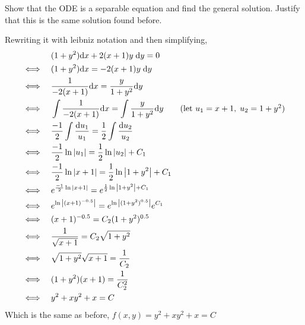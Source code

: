 Show that the ODE is a separable equation and find the general solution. Justify that this is the same solution found before.

\nnl Rewriting it with leibniz notation and then simplifying,
\begin{align*}
     & \quad (1+y^2)\dd x + 2(x+1)y\; \dd y = 0\\
    \iff & \quad (1+y^2)\dd x = -2(x+1)y\; \dd y\\
    \iff & \quad \frac{1}{-2(x+1)}\dd x = \frac{y}{1+y^2} \dd y\\
    \iff & \quad \int \frac{1}{-2(x+1)}\dd x = \int \frac{y}{1+y^2} \dd y \tag{let $u_1 = x+1, \; u_2 = 1+y^2$}\\
    \iff & \quad \frac{-1}{2} \int \frac{\dd u_1}{u_1} = \frac{1}{2} \int \frac{\dd u_2}{u_2}\\
    \iff & \quad \frac{-1}{2} \ln \abs{u_1} = \frac{1}{2} \ln \abs{u_2} + C_1 \\
    \iff & \quad \frac{-1}{2} \ln \abs{x+1} = \frac{1}{2} \ln \abs{1+y^2} + C_1\\
    \iff & \quad e^{\frac{-1}{2} \ln \abs{x+1}} = e^{\frac{1}{2} \ln \abs{1+y^2} + C_1}\\
    \iff & \quad e^{\ln \abs{(x+1)^{-0.5}}}  = e^{\ln \abs{(1+y^2)^{0.5}}} e^{C_1}\\
    \iff & \quad (x+1)^{-0.5}  = C_2 (1+y^2)^{0.5}\\
    \iff & \quad \frac{1}{\sqrt{x+1}} = C_2 \sqrt{1+y^2}\\
    \iff & \quad \sqrt{1+y^2} \sqrt{x+1} = \frac{1}{C_2}\\
    \iff & \quad (1+y^2)(x+1) = \frac{1}{C_2^2}\\
    \iff & \quad y^2 + xy^2 + x = C\\
\end{align*}
Which is the same as before, $f(x,y) = y^2 + xy^2 + x = C$